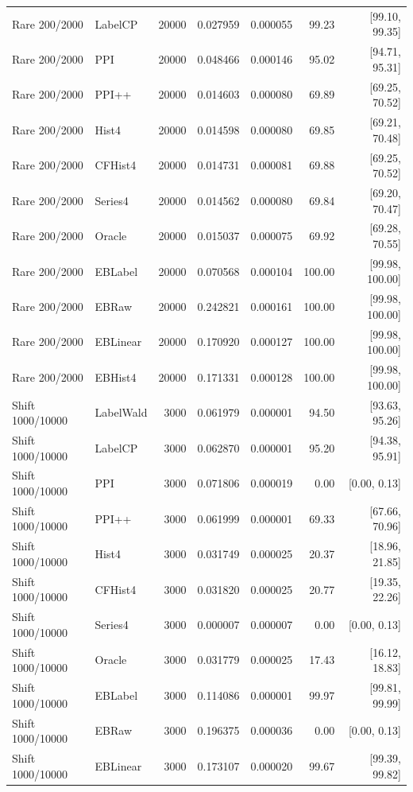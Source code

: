 \begin{longtable}{llrrrrr}
Rare 200/2000 & LabelCP & 20000 & 0.027959 & 0.000055 & 99.23 & [99.10, 99.35]\\
Rare 200/2000 & PPI & 20000 & 0.048466 & 0.000146 & 95.02 & [94.71, 95.31]\\
Rare 200/2000 & PPI++ & 20000 & 0.014603 & 0.000080 & 69.89 & [69.25, 70.52]\\
Rare 200/2000 & Hist4 & 20000 & 0.014598 & 0.000080 & 69.85 & [69.21, 70.48]\\
Rare 200/2000 & CFHist4 & 20000 & 0.014731 & 0.000081 & 69.88 & [69.25, 70.52]\\
Rare 200/2000 & Series4 & 20000 & 0.014562 & 0.000080 & 69.84 & [69.20, 70.47]\\
Rare 200/2000 & Oracle & 20000 & 0.015037 & 0.000075 & 69.92 & [69.28, 70.55]\\
Rare 200/2000 & EBLabel & 20000 & 0.070568 & 0.000104 & 100.00 & [99.98, 100.00]\\
Rare 200/2000 & EBRaw & 20000 & 0.242821 & 0.000161 & 100.00 & [99.98, 100.00]\\
Rare 200/2000 & EBLinear & 20000 & 0.170920 & 0.000127 & 100.00 & [99.98, 100.00]\\
Rare 200/2000 & EBHist4 & 20000 & 0.171331 & 0.000128 & 100.00 & [99.98, 100.00]\\
Shift 1000/10000 & LabelWald & 3000 & 0.061979 & 0.000001 & 94.50 & [93.63, 95.26]\\
Shift 1000/10000 & LabelCP & 3000 & 0.062870 & 0.000001 & 95.20 & [94.38, 95.91]\\
Shift 1000/10000 & PPI & 3000 & 0.071806 & 0.000019 & 0.00 & [0.00, 0.13]\\
Shift 1000/10000 & PPI++ & 3000 & 0.061999 & 0.000001 & 69.33 & [67.66, 70.96]\\
Shift 1000/10000 & Hist4 & 3000 & 0.031749 & 0.000025 & 20.37 & [18.96, 21.85]\\
Shift 1000/10000 & CFHist4 & 3000 & 0.031820 & 0.000025 & 20.77 & [19.35, 22.26]\\
Shift 1000/10000 & Series4 & 3000 & 0.000007 & 0.000007 & 0.00 & [0.00, 0.13]\\
Shift 1000/10000 & Oracle & 3000 & 0.031779 & 0.000025 & 17.43 & [16.12, 18.83]\\
Shift 1000/10000 & EBLabel & 3000 & 0.114086 & 0.000001 & 99.97 & [99.81, 99.99]\\
Shift 1000/10000 & EBRaw & 3000 & 0.196375 & 0.000036 & 0.00 & [0.00, 0.13]\\
Shift 1000/10000 & EBLinear & 3000 & 0.173107 & 0.000020 & 99.67 & [99.39, 99.82]\\

\end{longtable}
